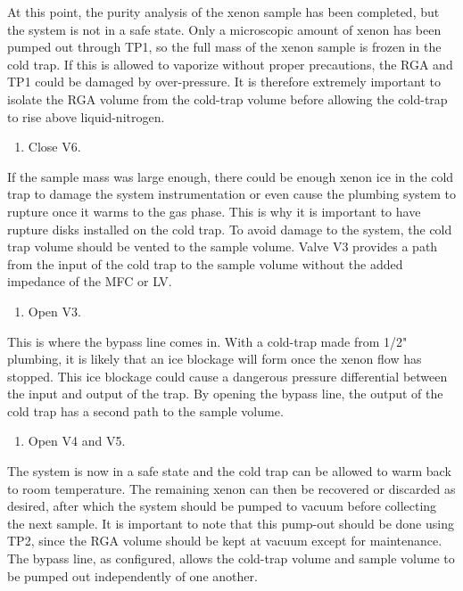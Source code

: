\noindent At this point, the purity analysis of the xenon sample has been completed, but the system is not in a safe state. Only a microscopic amount of xenon has been pumped out through TP1, so the full mass of the xenon sample is frozen in the cold trap. If this is allowed to vaporize without proper precautions, the RGA and TP1 could be damaged by  over-pressure. It is therefore extremely important to isolate the RGA volume from the cold-trap volume before allowing the cold-trap to rise above liquid-nitrogen.
\begin{enumerate}[resume]
\item \label{step:analysis_stop} Close V6.
\end{enumerate}
\noindent If the sample mass was large enough, there could be enough xenon ice in the cold trap to damage the system instrumentation or even cause the plumbing system to rupture once it warms to the gas phase. This is why it is important to have rupture disks installed on the cold trap. To avoid damage to the system, the cold trap volume should be vented to the sample volume. Valve V3 provides a path from the input of the cold trap to the sample volume without the added impedance of the MFC or LV.
\begin{enumerate}[resume]
\item Open V3. 
\end{enumerate}
\noindent This is where the bypass line comes in. With a cold-trap made from 1/2" plumbing, it is likely that an ice blockage will form once the xenon flow has stopped. This ice blockage could cause a dangerous pressure differential between the input and output of the trap. By opening the bypass line, the output of the cold trap has a second path to the sample volume.
\begin{enumerate}[resume]
\item Open V4 and V5. 
\end{enumerate}

The system is now in a safe state and the cold trap can be allowed to warm back to room temperature. The remaining xenon can then be recovered or discarded as desired, after which the system should be pumped to vacuum before collecting the next sample. It is important to note that this pump-out should be done using TP2, since the RGA volume should be kept at vacuum except for maintenance. The bypass line, as configured, allows the cold-trap volume and sample volume to be pumped out independently of one another.

